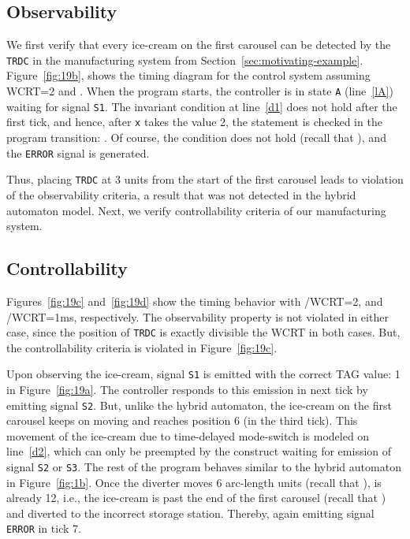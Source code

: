 \documentclass[10pt,journal,cspaper,compsoc]{IEEEtran}
\begin{document}
\subsection{Observability}
\label{sec:observability}

We first verify that every ice-cream on the first carousel can be
detected by the \texttt{TRDC} in the manufacturing system from
Section~\ref{sec:motivating-example}. Figure~\ref{fig:19b}, shows the
timing diagram for the control system assuming WCRT=2 and
. When the program starts, the controller is in state
\texttt{A} (line~\ref{lA}) waiting for signal \texttt{S1}. The invariant
condition at line~\ref{d1} does not hold after the first tick, and
hence, after \texttt{x} takes the value 2, the  statement
is checked in the program transition: . Of course, the
 condition does not hold (recall that ), and
the \texttt{ERROR} signal is generated.

Thus, placing \texttt{TRDC} at 3 units from the start of the first
carousel leads to violation of the observability criteria, a result that
was not detected in the hybrid automaton model. Next, we verify
controllability criteria of our manufacturing system.

\subsection{Controllability}
\label{sec:controllability}

Figures~\ref{fig:19c} and~\ref{fig:19d} show the timing behavior with
/WCRT=2, and /WCRT=1ms, respectively. The
observability property is not violated in either case, since the
position of \texttt{TRDC} is exactly divisible the WCRT in both
cases. But, the controllability criteria is violated in
Figure~\ref{fig:19c}.

Upon observing the ice-cream, signal \texttt{S1} is emitted with the
correct TAG value: 1 in Figure~\ref{fig:19a}. The controller responds to
this emission in next tick by emitting signal \texttt{S2}. But, unlike
the hybrid automaton, the ice-cream on the first carousel keeps on
moving and reaches position 6 (in the third tick). This movement of the
ice-cream due to time-delayed mode-switch is modeled on line~\ref{d2},
which can only be preempted by the  construct waiting
for emission of signal \texttt{S2} or \texttt{S3}. The rest of the
program behaves similar to the hybrid automaton in
Figure~\ref{fig:1b}. Once the diverter moves 6 arc-length units (recall
that ),  is already 12, i.e., the ice-cream is past the
end of the first carousel (recall that ) and diverted to the
incorrect storage station. Thereby, again emitting signal \texttt{ERROR}
in tick 7.
\end{document}
